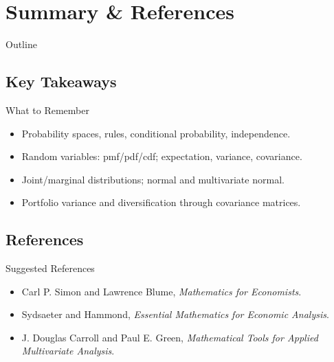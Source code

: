 \documentclass[aspectratio=169]{beamer}
\begin{document}
\section{Summary \& References}

\begin{frame}{Outline}
\end{frame}

\subsection{Key Takeaways}
\begin{frame}{What to Remember}
\begin{itemize}
  \item Probability spaces, rules, conditional probability, independence.
  \item Random variables: pmf/pdf/cdf; expectation, variance, covariance.
  \item Joint/marginal distributions; normal and multivariate normal.
  \item Portfolio variance and diversification through covariance matrices.
\end{itemize}
\end{frame}

\subsection{References}
\begin{frame}{Suggested References}
\begin{itemize}
  \item Carl P. Simon and Lawrence Blume, \textit{Mathematics for Economists}.
  \item Sydsaeter and Hammond, \textit{Essential Mathematics for Economic Analysis}.
  \item J. Douglas Carroll and Paul E. Green, \textit{Mathematical Tools for Applied Multivariate Analysis}.
\end{itemize}
\end{frame}
\end{document}
